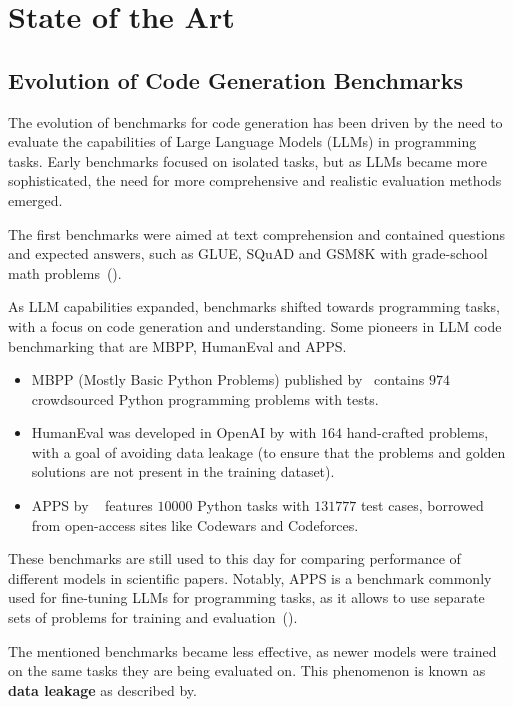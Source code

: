 \chapter{State of the Art}

\section{Evolution of Code Generation Benchmarks}

The evolution of benchmarks for code generation has been driven by the need to evaluate the capabilities of Large Language Models (LLMs) in programming tasks.
Early benchmarks focused on isolated tasks, but as LLMs became more sophisticated, the need for more comprehensive and realistic evaluation methods emerged.

The first benchmarks were aimed at text comprehension and contained questions and expected answers, such as GLUE, SQuAD and GSM8K with grade-school math problems~(\cite{vendrow2025largelanguagemodelbenchmarks}).

As LLM capabilities expanded, benchmarks shifted towards programming tasks, with a focus on code generation and understanding.
Some pioneers in LLM code benchmarking that are MBPP, HumanEval and APPS.
\begin{itemize}
\item MBPP (Mostly Basic Python Problems) published by~\cite{austin2021program} contains $974$ crowdsourced Python programming problems with tests.

\item HumanEval was developed in OpenAI by\cite{chen2021evaluatinglargelanguagemodels} with $164$ hand-crafted problems, with a goal of avoiding data leakage (to ensure that the problems and golden solutions are not present in the training dataset).

\item APPS by ~\cite{hendrycksapps2021} features $10000$ Python tasks with $131777$ test cases, borrowed from open-access sites like Codewars and Codeforces.
\end{itemize}
These benchmarks are still used to this day for comparing performance of different models in scientific papers.
Notably, APPS is a benchmark commonly used for fine-tuning LLMs for programming tasks, as it allows to use separate sets of problems for training and evaluation~(\cite{bigcode-evaluation-harness}).

The mentioned benchmarks became less effective, as newer models were trained on the same tasks they are being evaluated on.
This phenomenon is known as \textbf{data leakage} as described by\cite{vendrow2025largelanguagemodelbenchmarks}.

